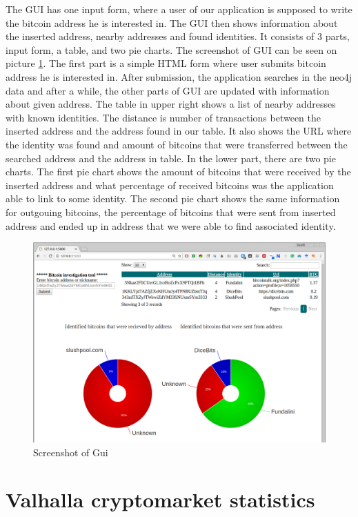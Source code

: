 \documentclass[
  digital, %
  table,   %
  lof,     %
  lot,     %
  oneside
]{fithesis3}
\begin{document}
The GUI has one input form, where a user of our application is supposed to write the bitcoin address he is interested in.
The GUI then shows information about the inserted address, nearby addresses and found identities.
It consists of 3 parts, input form, a table, and two pie charts. The screenshot of GUI can be seen on picture \ref{guiscreen}.
The first part is a simple HTML form where user submits bitcoin address he is interested in.
After submission, the application searches in the neo4j data and after a while,
the other parts of GUI are updated with information about given address.
The table in upper right shows a list of nearby addresses with known identities. The distance is number of transactions
between the inserted address and the address found in our table. It also shows the URL where the identity was found
and amount of bitcoins that were transferred between the searched address and the address in table.
In the lower part, there are two pie charts. The first pie chart shows the amount of bitcoins that were received by the inserted address
and what percentage of received bitcoins was the application able to link to some identity.
The second pie chart shows the same information for outgouing bitcoins, the percentage of bitcoins that were sent from inserted address
and ended up in address that we were able to find associated identity.

\begin{figure}[!htb]
\hspace*{-1cm}
    \centering
    \includegraphics[width=1\textwidth]{shot}
    \caption{Screenshot of Gui}
    \label{guiscreen}
\end{figure}

\chapter{Valhalla cryptomarket statistics}
\label{stats}
\end{document}
